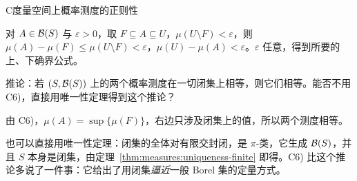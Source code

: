 \begin{probleme}{C}{度量空间上概率测度的正则性}
\begin{questions}
\begin{solution}
对 $A\in\mathcal{B}(S)$ 与 $\varepsilon>0$，取 $F\subseteq A\subseteq U$，$\mu(U\setminus F)<\varepsilon$，则 $\mu(A)-\mu(F)\leqslant\mu(U\setminus F)<\varepsilon$，$\mu(U)-\mu(A)<\varepsilon$。$\varepsilon$ 任意，得到所要的上、下确界公式。
\end{solution}
\item 推论：若 $(S,\mathcal{B}(S))$ 上的两个概率测度在一切闭集上相等，则它们相等。能否不用 C6)，直接用唯一性定理得到这个推论？
\begin{solution}
由 C6)，$\mu(A)=\sup\{\mu(F)\}$，右边只涉及闭集上的值，所以两个测度相等。

也可以直接用唯一性定理：闭集的全体对有限交封闭，是 $\pi$-类，它生成 $\mathcal{B}(S)$，并且 $S$ 本身是闭集，由定理~\ref{thm:measures:uniqueness-finite} 即得。C6) 比这个推论多说了一件事：它给出了用闭集\emph{逼近}一般 Borel 集的定量方式。
\end{solution}
\end{questions}
\end{probleme}

\thinkingpart

